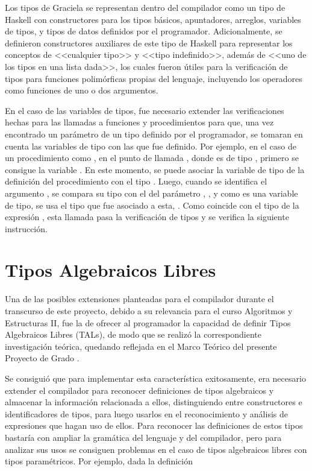 {{Los tipos de Graciela se representan dentro del compilador como un
tipo de Haskell con constructores para los tipos básicos, apuntadores, arreglos,
variables de tipos, y tipos de datos definidos por el programador.
Adicionalmente, se definieron constructores auxiliares de este tipo de Haskell
para representar los conceptos de <<cualquier tipo>> y <<tipo indefinido>>,
además de <<uno de los tipos en una lista dada>>, los cuales fueron útiles para
la verificación de tipos para funciones polimórficas propias del lenguaje,
incluyendo los operadores como funciones de uno o dos argumentos.

En el caso de las variables de tipos, fue necesario extender las verificaciones
hechas para las llamadas a funciones y procedimientos para que, una vez
encontrado un parámetro de un tipo definido por el programador, se tomaran en
cuenta las variables de tipo con las que fue definido. Por ejemplo, en el caso
de un procedimiento como , en el punto
de llamada , donde  es de tipo
, primero se consigue la variable . En este
momento, se puede asociar la variable de tipo  de la definición del
procedimiento  con el tipo . Luego, cuando se
identifica el argumento , se compara su tipo con el del parámetro
, , y como es una variable de tipo, se usa el tipo que fue
asociado a esta, . Como coincide con el tipo de la expresión
, esta llamada pasa la verificación de tipos y se verifica la
siguiente instrucción.

\section{Tipos Algebraicos Libres}

Una de las posibles extensiones planteadas para el compilador durante el
transcurso de este proyecto, debido a su relevancia para el curso Algoritmos y
Estructuras II, fue la de ofrecer al programador la capacidad de definir Tipos
Algebraicos Libres (TALs), de modo que se realizó la correspondiente investigación
teórica, quedando reflejada en el Marco Teórico del presente Proyecto de Grado
.

Se consiguió que para implementar esta característica exitosamente, era
necesario extender el compilador para reconocer definiciones de tipos
algebraicos y almacenar la información relacionada a ellos, distinguiendo entre
constructores e identificadores de tipos, para luego usarlos en el
reconocimiento y análisis de expresiones que hagan uso de ellos. Para reconocer
las definiciones de estos tipos bastaría con ampliar la gramática del lenguaje y
del compilador, pero para analizar sus usos se consiguen problemas en el caso de
tipos algebraicos libres con tipos paramétricos. Por ejemplo, dada la definición

}}
